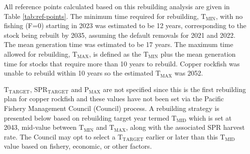 \documentclass[11pt,
  english,
  a4paper,
]{article}
\begin{document}
All reference points calculated based on this rebuilding analysis are given in Table \ref{tab:ref-points}. The minimum time required for rebuilding, {\(\text{T}_\text{MIN}\)\leavevmode\tagmcend\tagstructend}, with no fishing (F=0) starting in 2023 was estimated to be 12 years, corresponding to the stock being rebuilt by 2035, assuming the default removals for 2021 and 2022. The mean generation time was estimated to be 17 years. The maximum time allowed for rebuilding, {\(\text{T}_\text{MAX}\)\leavevmode\tagmcend\tagstructend}, is defined as the {\(\text{T}_\text{MIN}\)\leavevmode\tagmcend\tagstructend} plus the mean generation time for stocks that require more than 10 years to rebuild. Copper rockfish was unable to rebuild within 10 years so the estimated {\(\text{T}_\text{MAX}\)\leavevmode\tagmcend\tagstructend} was 2052.

\leavevmode\tagmcend\tagstructend\par


{\(\text{T}_\text{TARGET}\)\leavevmode\tagmcend\tagstructend}, {\(\text{SPR}_\text{TARGET}\)\leavevmode\tagmcend\tagstructend} and {\(\text{P}_\text{MAX}\)\leavevmode\tagmcend\tagstructend} are not specified since this is the first rebuilding plan for copper rockfish and these values have not been set via the Pacific Fishery Management Council (Council) process. A rebuilding strategy is presented below based on rebuilding target year termed {\(\text{T}_\text{MID}\)\leavevmode\tagmcend\tagstructend} which is set at 2043, mid-value between {\(\text{T}_\text{MIN}\)\leavevmode\tagmcend\tagstructend} and {\(\text{T}_\text{MAX}\)\leavevmode\tagmcend\tagstructend}, along with the associated SPR harvest rate. The Council may opt to select a {\(\text{T}_\text{TARGET}\)\leavevmode\tagmcend\tagstructend} earlier or later than this {\(\text{T}_\text{MID}\)\leavevmode\tagmcend\tagstructend} value based on fishery, economic, or other factors.
\end{document}
